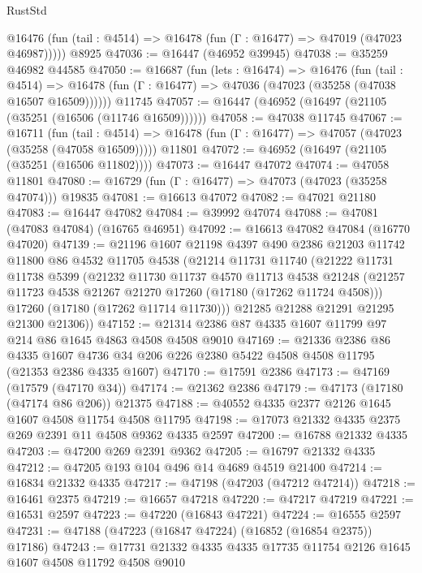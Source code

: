 \begin{lexlean}{RustStd}
\begin{coremodule}
{\begin{coremodule}
{{{{{{{{{{{{{{{{{{{{{{{{{{{{{{{{{{{{{{{{{{{{{{{{{{{{{{{      @16476 (fun (tail : @4514) => @16478 (fun (Γ : @16477) => @47019 (@47023 @46987)))))
    @8925
@47036 := @16447 (@46952 @39945)
@47038 := @35259 @46982 @44585
@47050 := @16687
    (fun (lets : @16474) =>
    @16476
      (fun (tail : @4514) =>
      @16478 (fun (Γ : @16477) => @47036 (@47023 (@35258 (@47038 @16507 @16509))))))
    @11745
@47057 := @16447 (@46952 (@16497 (@21105 (@35251 (@16506 (@11746 @16509))))))
@47058 := @47038 @11745
@47067 := @16711
    (fun (tail : @4514) => @16478 (fun (Γ : @16477) => @47057 (@47023 (@35258 (@47058 @16509)))))
    @11801
@47072 := @46952 (@16497 (@21105 (@35251 (@16506 @11802))))
@47073 := @16447 @47072
@47074 := @47058 @11801
@47080 := @16729 (fun (Γ : @16477) => @47073 (@47023 (@35258 @47074))) @19835
@47081 := @16613 @47072
@47082 := @47021 @21180
@47083 := @16447 @47082
@47084 := @39992 @47074
@47088 := @47081 (@47083 @47084) (@16765 @46951)
@47092 := @16613 @47082 @47084 (@16770 @47020)
@47139 := @21196
    @1607
    @21198
    @4397
    @490
    @2386
    @21203
    @11742
    @11800
    @86
    @4532
    @11705
    @4538
    (@21214
      @11731
      @11740
      (@21222
        @11731
        @11738
        @5399
        (@21232
          @11730
          @11737
          @4570
          @11713
          @4538
          @21248
          (@21257 @11723 @4538 @21267 @21270 @17260 (@17180 (@17262 @11724 @4508)))
          @17260
          (@17180 (@17262 @11714 @11730)))
        @21285
        @21288
        @21291
        @21295
        @21300
        @21306))
@47152 := @21314 @2386 @87 @4335 @1607 @11799 @97 @214 @86 @1645 @4863 @4508 @4508 @9010
@47169 := @21336
    @2386
    @86
    @4335
    @1607
    @4736
    @34
    @206
    @226
    @2380
    @5422
    @4508
    @4508
    @11795
    (@21353 @2386 @4335 @1607)
@47170 := @17591 @2386
@47173 := @47169 (@17579 (@47170 @34))
@47174 := @21362 @2386
@47179 := @47173 (@17180 (@47174 @86 @206)) @21375
@47188 := @40552 @4335 @2377 @2126 @1645 @1607 @4508 @11754 @4508 @11795
@47198 := @17073 @21332 @4335 @2375 @269 @2391 @11 @4508 @9362 @4335 @2597
@47200 := @16788 @21332 @4335
@47203 := @47200 @269 @2391 @9362
@47205 := @16797 @21332 @4335
@47212 := @47205 @193 @104 @496 @14 @4689 @4519 @21400
@47214 := @16834 @21332 @4335
@47217 := @47198 (@47203 (@47212 @47214))
@47218 := @16461 @2375
@47219 := @16657 @47218
@47220 := @47217 @47219
@47221 := @16531 @2597
@47223 := @47220 (@16843 @47221)
@47224 := @16555 @2597
@47231 := @47188 (@47223 (@16847 @47224) (@16852 (@16854 @2375)) @17186)
@47243 := @17731 @21332 @4335 @4335 @17735 @11754 @2126 @1645 @1607 @4508 @11792 @4508 @9010
}}}}}}}}}}}}}}}}}}}}}}}}}}}}}}}}}}}}}}}}}}}}}}}}}}}}}}}
\end{coremodule}}
\end{coremodule}
\end{lexlean}
